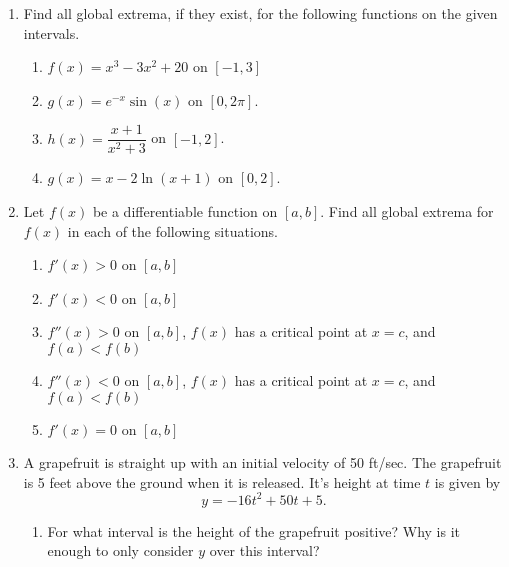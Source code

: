 \documentclass[11pt]{article}
\begin{document}
\drawtitle
\begin{enumerate}
\item Find all global extrema, if they exist, for the following
  functions on the given intervals.
  \begin{enumerate}
  \item $f(x) =x^3 - 3x^2 + 20$ on $[-1,3]$
    \vfill

  \item $g(x) = e^{-x}\sin(x)$ on $[0,2\pi]$.
    \vfill
    \newpage

  \item $h(x) = \dfrac{x+1}{x^2 + 3}$ on $[-1, 2]$.
    \vfill

  \item $g(x) = x - 2\ln(x+1)$ on $[0,2]$.
    \vfill

  \end{enumerate}

\newpage

\item Let $f(x)$ be a differentiable function on $[a,b]$. Find all
  global extrema for $f(x)$ in each of the following situations.
  \begin{enumerate}
  \item $f'(x) > 0$ on $[a,b]$
    \vfill

  \item $f'(x) < 0$ on $[a,b]$
    \vfill

  \item $f''(x) > 0$ on $[a,b]$, $f(x)$ has a critical point at $x=c$,
    and $f(a) < f(b)$
    \vfill

  \item $f''(x) < 0$ on $[a,b]$, $f(x)$ has a critical point at $x=c$,
    and $f(a) < f(b)$
    \vfill

  \item $f'(x) = 0$ on $[a,b]$
    \vfill

  \end{enumerate}

\newpage

\item A grapefruit is straight up with an initial velocity of 50
  ft/sec.  The grapefruit is 5 feet above the ground when it is
  released.  It's height at time $t$ is given by
  \[
  y=-16t^2+50t+5.
  \]
  \begin{enumerate}
  \item For what interval is the height of the grapefruit positive?
    Why is it enough to only consider $y$ over this interval?
    \vfill



\end{enumerate}
\end{enumerate}
\end{document}
